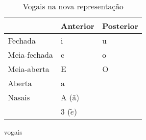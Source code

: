 \begin{center}
\begin{table}[H]
\begin{center}
    \begin{tabular}{lll}
        \hline
         & Anterior & Posterior \\
         \hline
        Fechada & i & u \\
        \hline
        Meia-fechada & e & o \\
        \hline
        Meia-aberta & E & O \\
        \hline
        Aberta & a &  \\
        \hline
        Nasais & A (ã) &\\ & 3 ($\tilde{e}$) &\\ 
        \hline
    \end{tabular}
\end{center}
\caption{Vogais na nova representação}
\label{tab:new_vocals}
\end{table}
\end{center}

vogais 


